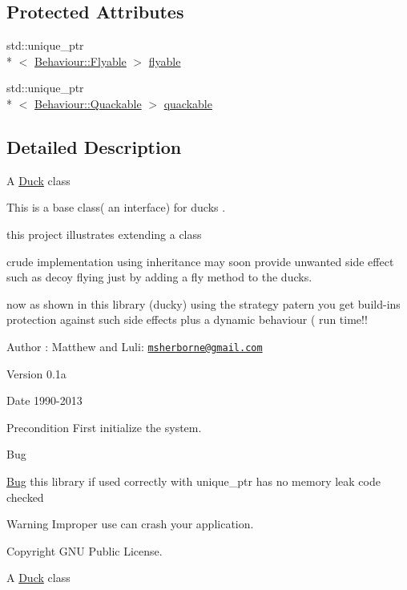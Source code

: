 \subsection*{Protected Attributes}
\begin{DoxyCompactItemize}
\item 
std\-::unique\-\_\-ptr\\*
$<$ \hyperlink{classDuck_1_1Behaviour_1_1Flyable}{Behaviour\-::\-Flyable} $>$ \hyperlink{classDuck_1_1Base_aa0d116b55dc759d6d5c01eeb9af5add9}{flyable}
\item 
std\-::unique\-\_\-ptr\\*
$<$ \hyperlink{classDuck_1_1Behaviour_1_1Quackable}{Behaviour\-::\-Quackable} $>$ \hyperlink{classDuck_1_1Base_ae34ecb3b0d147b27551f401cae8f0ebb}{quackable}
\end{DoxyCompactItemize}


\subsection{Detailed Description}
A \hyperlink{namespaceDuck}{Duck} class

This is a base class( an interface) for ducks .\par
 this project illustrates extending a class \par
 crude implementation using inheritance may soon provide unwanted side effect such as decoy flying just by adding a fly method to the ducks.\par
 now as shown in this library (ducky) using the strategy patern you get build-\/ins protection against such side effects plus a dynamic behaviour ( run time!! \begin{DoxyAuthor}{Author}
\-: Matthew and Luli\-: \href{mailto:msherborne@gmail.com}{\tt msherborne@gmail.\-com} 
\end{DoxyAuthor}
\begin{DoxyVersion}{Version}
0.\-1a 
\end{DoxyVersion}
\begin{DoxyDate}{Date}
1990-\/2013 
\end{DoxyDate}
\begin{DoxyPrecond}{Precondition}
First initialize the system. 
\end{DoxyPrecond}
\begin{DoxyRefDesc}{Bug}
\item[\hyperlink{bug__bug000001}{Bug}]this library if used correctly with unique\-\_\-ptr has no memory leak code checked \end{DoxyRefDesc}
\begin{DoxyWarning}{Warning}
Improper use can crash your application. 
\end{DoxyWarning}
\begin{DoxyCopyright}{Copyright}
G\-N\-U Public License. \par

\end{DoxyCopyright}
A \hyperlink{namespaceDuck}{Duck} class

